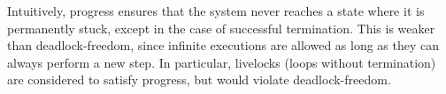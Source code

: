Intuitively, progress ensures that the system never reaches a state
where it is permanently stuck, except in the case of successful termination.
This is weaker than deadlock-freedom, since infinite executions are allowed
as long as they can always perform a new step. In particular, livelocks
(loops without termination) are considered to satisfy progress, but would
violate deadlock-freedom.










